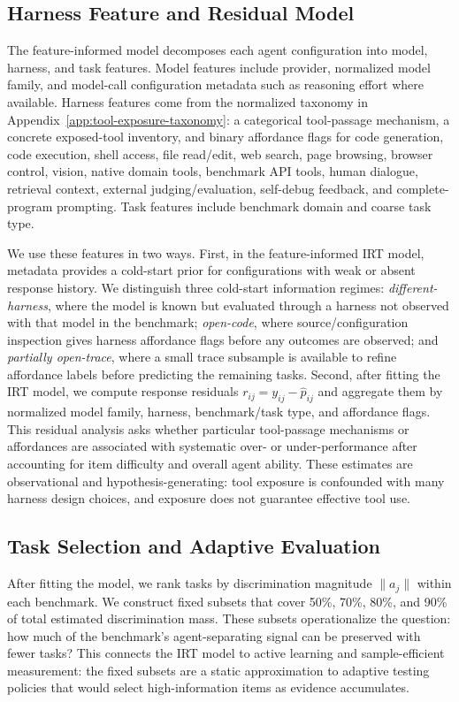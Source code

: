 \documentclass{article}
\begin{document}
\subsection{Harness Feature and Residual Model}

The feature-informed model decomposes each agent configuration into model, harness, and task features. Model features include provider, normalized model family, and model-call configuration metadata such as reasoning effort where available. Harness features come from the normalized taxonomy in Appendix~\ref{app:tool-exposure-taxonomy}: a categorical tool-passage mechanism, a concrete exposed-tool inventory, and binary affordance flags for code generation, code execution, shell access, file read/edit, web search, page browsing, browser control, vision, native domain tools, benchmark API tools, human dialogue, retrieval context, external judging/evaluation, self-debug feedback, and complete-program prompting. Task features include benchmark domain and coarse task type.

We use these features in two ways. First, in the feature-informed IRT model, metadata provides a cold-start prior for configurations with weak or absent response history. We distinguish three cold-start information regimes: \emph{different-harness}, where the model is known but evaluated through a harness not observed with that model in the benchmark; \emph{open-code}, where source/configuration inspection gives harness affordance flags before any outcomes are observed; and \emph{partially open-trace}, where a small trace subsample is available to refine affordance labels before predicting the remaining tasks. Second, after fitting the IRT model, we compute response residuals $r_{ij}=y_{ij}-\hat p_{ij}$ and aggregate them by normalized model family, harness, benchmark/task type, and affordance flags. This residual analysis asks whether particular tool-passage mechanisms or affordances are associated with systematic over- or under-performance after accounting for item difficulty and overall agent ability. These estimates are observational and hypothesis-generating: tool exposure is confounded with many harness design choices, and exposure does not guarantee effective tool use.

\subsection{Task Selection and Adaptive Evaluation}

After fitting the model, we rank tasks by discrimination magnitude $\|a_j\|$ within each benchmark. We construct fixed subsets that cover 50\%, 70\%, 80\%, and 90\% of total estimated discrimination mass. These subsets operationalize the question: how much of the benchmark's agent-separating signal can be preserved with fewer tasks? This connects the IRT model to active learning and sample-efficient measurement: the fixed subsets are a static approximation to adaptive testing policies that would select high-information items as evidence accumulates.
\end{document}
